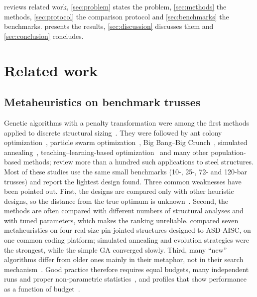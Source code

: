 \documentclass[lineno,pdflatex,sn-mathphys-num]{sn-jnl}
\begin{document}
 reviews related work, \cref{sec:problem} states the
problem, \cref{sec:methods} the methods,
\cref{sec:protocol} the comparison protocol and \cref{sec:benchmarks} the
benchmarks.  presents the results, \cref{sec:discussion}
discusses them and \cref{sec:conclusion} concludes.


\section{Related work}
\label{sec:related}

\subsection{Metaheuristics on benchmark trusses}
Genetic algorithms with a penalty transformation were among the first methods
applied to discrete structural sizing~\citep{Rajeev1992}. They were followed by ant
colony optimization~\citep{Camp2004}, particle swarm
optimization~\citep{Perez2007}, Big Bang--Big Crunch~\citep{Camp2007},
simulated annealing~\citep{Lamberti2008}, teaching--learning-based
optimization~\citep{Degertekin2013} and many other population-based methods;
\citet{Saka2013} review more than a hundred such applications to steel
structures. Most of these studies use the same small benchmarks (10-, 25-, 72-
and 120-bar trusses) and report the lightest design found. Three common
weaknesses have been pointed out. First, the designs are compared only with
other heuristic designs, so the distance from the true optimum is
unknown~\citep{Stolpe2016}. Second, the methods are often compared with
different numbers of structural analyses and with tuned parameters, which makes
the ranking unreliable. \citet{Hasancebi2009} compared seven metaheuristics on four
real-size pin-jointed structures designed to ASD-AISC, on one common coding
platform; simulated annealing and evolution strategies were the strongest,
while the simple GA converged slowly. Third, many
``new'' algorithms differ from older ones mainly in their metaphor, not in
their search mechanism~\citep{Sorensen2015}. Good practice therefore requires
equal budgets, many independent runs and proper non-parametric
statistics~\citep{Derrac2011}, and profiles that show performance as a function
of budget~\citep{Dolan2002,More2009}.
\end{document}
